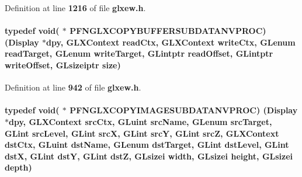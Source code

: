 Definition at line {\bf 1216} of file {\bf glxew.\+h}.

\paragraph[{P\+F\+N\+G\+L\+X\+C\+O\+P\+Y\+B\+U\+F\+F\+E\+R\+S\+U\+B\+D\+A\+T\+A\+N\+V\+P\+R\+OC}]{\setlength{\rightskip}{0pt plus 5cm}typedef {\bf void}( $\ast$  P\+F\+N\+G\+L\+X\+C\+O\+P\+Y\+B\+U\+F\+F\+E\+R\+S\+U\+B\+D\+A\+T\+A\+N\+V\+P\+R\+OC) (Display $\ast$dpy, {\bf G\+L\+X\+Context} read\+Ctx, {\bf G\+L\+X\+Context} write\+Ctx, {\bf G\+Lenum} read\+Target, {\bf G\+Lenum} write\+Target, {\bf G\+Lintptr} read\+Offset, {\bf G\+Lintptr} write\+Offset, {\bf G\+Lsizeiptr} {\bf size})}\label{glxew_8h_ae1f2f650eeafcf011b6c29fcb29aec25}


Definition at line {\bf 942} of file {\bf glxew.\+h}.

\paragraph[{P\+F\+N\+G\+L\+X\+C\+O\+P\+Y\+I\+M\+A\+G\+E\+S\+U\+B\+D\+A\+T\+A\+N\+V\+P\+R\+OC}]{\setlength{\rightskip}{0pt plus 5cm}typedef {\bf void}( $\ast$  P\+F\+N\+G\+L\+X\+C\+O\+P\+Y\+I\+M\+A\+G\+E\+S\+U\+B\+D\+A\+T\+A\+N\+V\+P\+R\+OC) (Display $\ast$dpy, {\bf G\+L\+X\+Context} src\+Ctx, {\bf G\+Luint} {\bf src\+Name}, {\bf G\+Lenum} {\bf src\+Target}, {\bf G\+Lint} {\bf src\+Level}, {\bf G\+Lint} {\bf srcX}, {\bf G\+Lint} {\bf srcY}, {\bf G\+Lint} {\bf srcZ}, {\bf G\+L\+X\+Context} dst\+Ctx, {\bf G\+Luint} {\bf dst\+Name}, {\bf G\+Lenum} {\bf dst\+Target}, {\bf G\+Lint} {\bf dst\+Level}, {\bf G\+Lint} {\bf dstX}, {\bf G\+Lint} {\bf dstY}, {\bf G\+Lint} {\bf dstZ}, {\bf G\+Lsizei} {\bf width}, {\bf G\+Lsizei} {\bf height}, {\bf G\+Lsizei} {\bf depth})}\label{glxew_8h_a6b3a4bb777aa55a4fa1cae092eb778b9}


